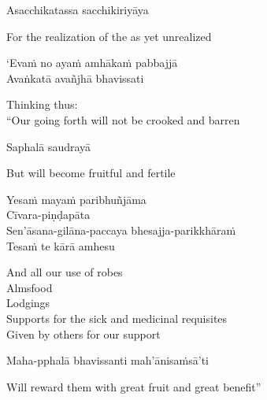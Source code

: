Asacchikatassa sacchikiriyāya

\begin{english}
  For the realization of the as yet unrealized
\end{english}

`Evaṁ no ayaṁ amhākaṁ pabbajjā\\
Avaṅkatā avañjhā \ifdigital\makeatletter\hyperlink{endnote90-appendix}\makeatother \thinspace\fi
bhavissati

\begin{english}
  Thinking thus:\\
  ``Our going forth will not be crooked and barren\ifdigital\makeatletter\hyperlink{endnote91-appendix}\makeatother\fi
\end{english}

Saphalā saudrayā

\begin{english}
  But will become fruitful and fertile
\end{english}

Yesaṁ mayaṁ paribhuñjāma\\
Cīvara-piṇḍapāta\\
Sen'āsana-gilāna-paccaya bhesajja-parikkhāraṁ\\
Tesaṁ te kārā amhesu

\ifbfive\clearpage\fi
\ifafive\clearpage\fi

\begin{english-verses}
  And all our use of robes\\
  Almsfood\\
  Lodgings\\
  Supports for the sick and medicinal requisites\ifdigital\makeatletter\hyperlink{endnote92-appendix}\makeatother\fi\\
  Given by others for our support
\end{english-verses}

Maha-pphalā bhavissanti mah'ānisaṁsā'ti

\begin{english}
  Will reward them with great fruit and great benefit''
\end{english}

